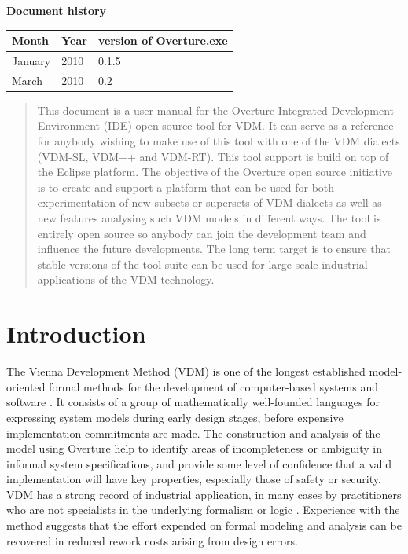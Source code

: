 \documentclass{overturerep}
\begin{document}
{\textbf{Document history}

\begin{tabular}{|l|l|l|}\hline
Month   & Year & version of Overture.exe \\ \hline
January & 2010 & 0.1.5 \\ \hline
March   & 2010 & 0.2   \\ \hline
\end{tabular}

\tableofcontents

\begin{abstract}
This document is a user manual for the Overture Integrated Development
Environment (IDE) open source tool for
VDM. It can serve as a reference for anybody wishing to make use of
this tool with one of the VDM dialects (VDM-SL, VDM++ and VDM-RT).
This tool support is build on top of the Eclipse platform. The
objective of the Overture open source initiative is to create and support a
platform that can be used for both experimentation of new subsets or
supersets of VDM dialects as well as new features analysing such VDM
models in different ways. The tool is entirely open source so anybody
can join the development team and influence the future
developments. The long term target is to ensure that stable
versions of the tool suite can be used for large scale industrial
applications of the VDM technology.
\end{abstract}

\section{Introduction}

The Vienna Development Method (VDM) is one of the longest established
model-oriented formal methods for the development of computer-based
systems and software
\cite{Bjorner&78,Jones90a,Fitzgerald&08c}. It consists of a
group of mathematically well-founded languages for expressing system
models during early design stages, before expensive implementation
commitments are made. The construction and analysis of the model using
Overture help to identify areas of incompleteness or ambiguity in
informal system specifications, and provide some level of confidence
that a valid implementation will have key properties, especially those
of safety or security. VDM has a strong record of industrial
application, in many cases by practitioners who are not specialists in
the underlying formalism or logic
\cite{Larsen&95b,Clement&99,Kurita&09}. Experience with the method
suggests that the effort expended on formal modeling and analysis can
be recovered in reduced rework costs arising from design errors.

}
\end{document}
